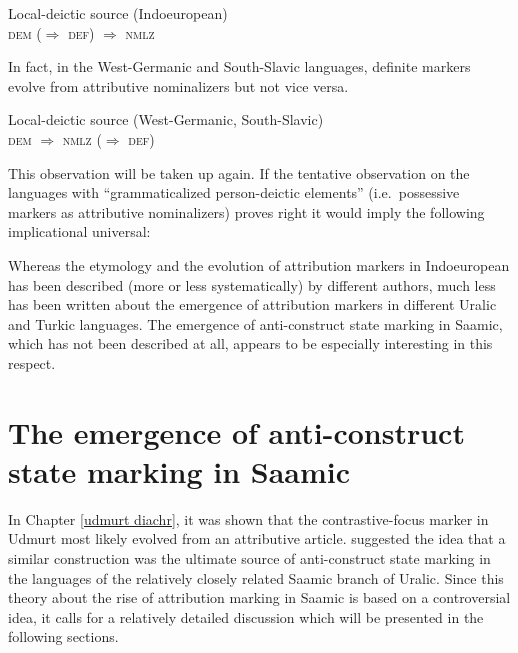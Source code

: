 {\begin{exe}
\ex Local-deictic source (Indoeuropean)\\
	\textsc{dem ($\Rightarrow$ def) $\Rightarrow$ nmlz}
\end{exe}
In fact, in the West-Germanic and South-Slavic languages, definite markers evolve from attributive nominalizers but not vice versa. 
\begin{exe}
\ex Local-deictic source (West-Germanic, South-Slavic)\\
	\textsc{dem $\Rightarrow$ nmlz ($\Rightarrow$ def)}
\end{exe}
This observation will be taken up again. If the tentative observation on the languages with “grammaticalized person-deictic elements” (i.e.~possessive markers as attributive nominalizers) proves right it would imply the following implicational universal:


\noindent Whereas the etymology and the evolution of attribution markers in Indoeuropean has been described (more or less systematically) by different authors, much less has been written about the emergence of attribution markers in different Uralic and Turkic languages. The emergence of anti-construct state marking in Saamic, which has not been described at all, appears to be especially interesting in this respect.

\section[Anti-construct state in Saamic]{The emergence of anti-construct state marking in Saamic} \label{saamic diachr}

In Chapter \ref{udmurt diachr}, it was shown that the contrastive-focus marker in Udmurt most likely evolved from an attributive article. \cite{riesler2006b} suggested the idea that a similar construction was the ultimate source of anti-construct state marking in the languages of the relatively closely related Saamic branch of Uralic. Since this theory about the rise of attribution marking in Saamic is based on a controversial idea, it calls for a relatively detailed discussion which will be presented in the following sections.

}
